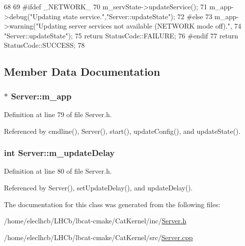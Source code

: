 \begin{DoxyCode}
68                                  {
69 #ifdef _NETWORK_
70   m_servState->updateService();
71   m_app->debug("Updating state service.","Server::updateState"); 
72 #else
73   m_app->warning("Updating server services not available (NETWORK mode off).",
74                  "Server::updateState"); 
75   return StatusCode::FAILURE;
76 #endif
77   return StatusCode::SUCCESS;
78 }
\end{DoxyCode}


\subsection{Member Data Documentation}
\hypertarget{classServer_ae1c25dc357c4a1145289c747fddaa251}{
\subsubsection[{m\_\-app}]{$\ast$ {\bf Server::m\_\-app}}}
\label{classServer_ae1c25dc357c4a1145289c747fddaa251}


Definition at line 79 of file Server.h.

Referenced by cmdline(), Server(), start(), updateConfig(), and updateState().\hypertarget{classServer_ae991d55181bff0552a34278ea9f76735}{
\subsubsection[{m\_\-updateDelay}]{\setlength{\rightskip}{0pt plus 5cm}int {\bf Server::m\_\-updateDelay}}}
\label{classServer_ae991d55181bff0552a34278ea9f76735}


Definition at line 80 of file Server.h.

Referenced by Server(), setUpdateDelay(), and updateDelay().

The documentation for this class was generated from the following files:\begin{DoxyCompactItemize}
\item 
/home/eleclhcb/LHCb/lbcat-\/cmake/CatKernel/inc/\hyperlink{Server_8h}{Server.h}\item 
/home/eleclhcb/LHCb/lbcat-\/cmake/CatKernel/src/\hyperlink{Server_8cpp}{Server.cpp}\end{DoxyCompactItemize}
